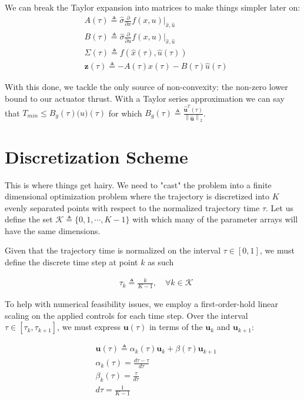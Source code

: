 We can break the Taylor expansion into matrices to make things simpler later on:
\begin{align}
& A(\tau) \triangleq \hat{\sigma} \frac{\partial}{\partial x} f(x,u) \bigg\rvert_{\hat{x},\hat{u}} \\
& B(\tau) \triangleq \hat{\sigma} \frac{\partial}{\partial u} f(x,u) \bigg\rvert_{\hat{x},\hat{u}} \\
& \Sigma(\tau) \triangleq f(\hat{x}(\tau),\hat{u}(\tau)) \\
& \mathbf{z}(\tau) \triangleq -A(\tau)\hat{x}(\tau) - B(\tau)\hat{u}(\tau)
\end{align}

With this done, we tackle the only source of non-convexity: the non-zero lower bound to our actuator thrust. With a Taylor series approximation we can say that $T_{min} \leq B_g(\tau)\mathbf(u)(\tau)$ for which $B_g(\tau) \triangleq \frac{\mathbf{\hat{u}}^T(\tau)}{\left\lVert \mathbf{\hat{u}} \right \lVert_2}$.



\section{Discretization Scheme}
This is where things get hairy. We need to "cast" the problem into a finite dimensional optimization problem where the trajectory is discretized into $K$ evenly separated points with respect to the normalized trajectory time $\tau$. Let us define the set $\mathcal{K}\triangleq \{0,1,\cdots, K-1\}$ with which many of the parameter arrays will have the same dimensions.

Given that the trajectory time is normalized on the interval $\tau \in [0,1 ]$, we must define the discrete time step at point $k$ as such

\begin{align}
& \tau_k \triangleq \frac{k}{K-1}, \quad \forall k \in \mathcal{K}
\end{align}

To help with numerical feasibility issues, we employ a first-order-hold linear scaling on the applied controls for each time step. Over the interval $\tau \in [\tau_k, \tau_{k+1}]$, we must express $\mathbf{u}(\tau)$ in terms of the $\mathbf{u}_k$
 and $\mathbf{u}_{k+1}$:

 \begin{align}
& \mathbf{u}(\tau) \triangleq \alpha_k(\tau) \mathbf{u}_k + \beta(\tau) \mathbf{u}_{k+1} \\ 
& \alpha_k(\tau) = \frac{d\tau - \tau}{d\tau} \\
& \beta_k(\tau) = \frac{\tau}{d\tau} \\
& d\tau = \frac{1}{K-1}
\end{align}

